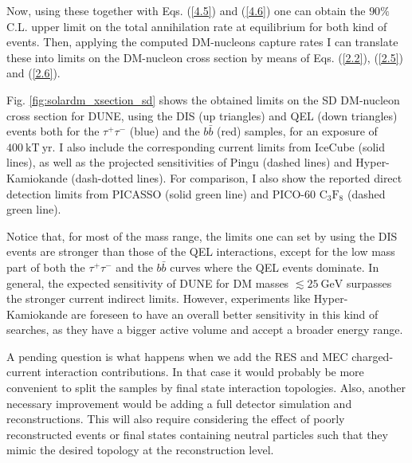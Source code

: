 Now, using these together with Eqs. (\ref{4.5}) and (\ref{4.6}) one can obtain the $90\%$ C.L. upper limit on the total annihilation rate at equilibrium for both kind of events. Then, applying the computed DM-nucleons capture rates I can translate these into limits on the DM-nucleon cross section by means of Eqs. (\ref{2.2}), (\ref{2.5}) and (\ref{2.6}).

Fig. \ref{fig:solardm_xsection_sd} shows the obtained limits on the SD DM-nucleon cross section for DUNE, using the DIS (up triangles) and QEL (down triangles) events both for the $\tau^{+}\tau^{-}$ (blue) and the $b\bar{b}$ (red) samples, for an exposure of $400 \ \mathrm{kT} \ \mathrm{yr}$. I also include the corresponding current limits from IceCube \cite{IceCube2021} (solid lines), as well as the projected sensitivities of Pingu \cite{Chen2014} (dashed lines) and Hyper-Kamiokande \cite{Bell2021} (dash-dotted lines). For comparison, I also show the reported direct detection limits from PICASSO \cite{Behnke2016} (solid green line) and PICO-60 $\mathrm{C}_{3}\mathrm{F}_{8}$ \cite{PICO2019} (dashed green line).

Notice that, for most of the mass range, the limits one can set by using the DIS events are stronger than those of the QEL interactions, except for the low mass part of both the $\tau^{+}\tau^{-}$ and the $b\bar{b}$ curves where the QEL events dominate. In general, the expected sensitivity of DUNE for DM masses $\lesssim 25 \ \mathrm{GeV}$ surpasses the stronger current indirect limits. However, experiments like Hyper-Kamiokande are foreseen to have an overall better sensitivity in this kind of searches, as they have a bigger active volume and accept a broader energy range.

A pending question is what happens when we add the RES and MEC charged-current interaction contributions. In that case it would probably be more convenient to split the samples by final state interaction topologies. Also, another necessary improvement would be adding a full detector simulation and reconstructions. This will also require considering the effect of poorly reconstructed events or final states containing neutral particles such that they mimic the desired topology at the reconstruction level.

